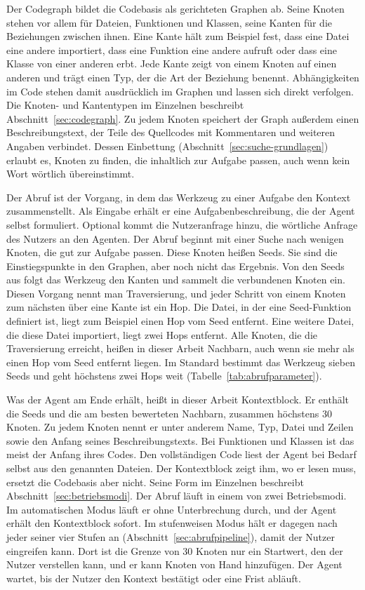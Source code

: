 Der Codegraph bildet die Codebasis als gerichteten Graphen ab. Seine Knoten stehen vor allem für Dateien, Funktionen und Klassen, seine Kanten für die Beziehungen zwischen ihnen. Eine Kante hält zum Beispiel fest, dass eine Datei eine andere importiert, dass eine Funktion eine andere aufruft oder dass eine Klasse von einer anderen erbt. Jede Kante zeigt von einem Knoten auf einen anderen und trägt einen Typ, der die Art der Beziehung benennt. Abhängigkeiten im Code stehen damit ausdrücklich im Graphen und lassen sich direkt verfolgen. Die Knoten- und Kantentypen im Einzelnen beschreibt Abschnitt~\ref{sec:codegraph}. Zu jedem Knoten speichert der Graph außerdem einen Beschreibungstext, der Teile des Quellcodes mit Kommentaren und weiteren Angaben verbindet. Dessen Einbettung (Abschnitt~\ref{sec:suche-grundlagen}) erlaubt es, Knoten zu finden, die inhaltlich zur Aufgabe passen, auch wenn kein Wort wörtlich übereinstimmt.

Der Abruf ist der Vorgang, in dem das Werkzeug zu einer Aufgabe den Kontext zusammenstellt. Als Eingabe erhält er eine Aufgabenbeschreibung, die der Agent selbst formuliert. Optional kommt die Nutzeranfrage hinzu, die wörtliche Anfrage des Nutzers an den Agenten. Der Abruf beginnt mit einer Suche nach wenigen Knoten, die gut zur Aufgabe passen. Diese Knoten heißen Seeds. Sie sind die Einstiegspunkte in den Graphen, aber noch nicht das Ergebnis. Von den Seeds aus folgt das Werkzeug den Kanten und sammelt die verbundenen Knoten ein. Diesen Vorgang nennt man Traversierung, und jeder Schritt von einem Knoten zum nächsten über eine Kante ist ein Hop. Die Datei, in der eine Seed-Funktion definiert ist, liegt zum Beispiel einen Hop vom Seed entfernt. Eine weitere Datei, die diese Datei importiert, liegt zwei Hops entfernt. Alle Knoten, die die Traversierung erreicht, heißen in dieser Arbeit Nachbarn, auch wenn sie mehr als einen Hop vom Seed entfernt liegen. Im Standard bestimmt das Werkzeug sieben Seeds und geht höchstens zwei Hops weit (Tabelle~\ref{tab:abrufparameter}).

Was der Agent am Ende erhält, heißt in dieser Arbeit Kontextblock. Er enthält die Seeds und die am besten bewerteten Nachbarn, zusammen höchstens 30 Knoten. Zu jedem Knoten nennt er unter anderem Name, Typ, Datei und Zeilen sowie den Anfang seines Beschreibungstexts. Bei Funktionen und Klassen ist das meist der Anfang ihres Codes. Den vollständigen Code liest der Agent bei Bedarf selbst aus den genannten Dateien. Der Kontextblock zeigt ihm, wo er lesen muss, ersetzt die Codebasis aber nicht. Seine Form im Einzelnen beschreibt Abschnitt~\ref{sec:betriebsmodi}. Der Abruf läuft in einem von zwei Betriebsmodi. Im automatischen Modus läuft er ohne Unterbrechung durch, und der Agent erhält den Kontextblock sofort. Im stufenweisen Modus hält er dagegen nach jeder seiner vier Stufen an (Abschnitt~\ref{sec:abrufpipeline}), damit der Nutzer eingreifen kann. Dort ist die Grenze von 30 Knoten nur ein Startwert, den der Nutzer verstellen kann, und er kann Knoten von Hand hinzufügen. Der Agent wartet, bis der Nutzer den Kontext bestätigt oder eine Frist abläuft.

